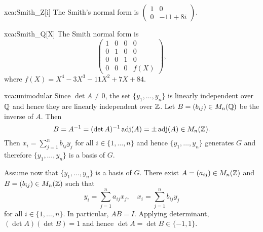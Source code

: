 \begin{sol}{xca:Smith_Z[i]}
	The Smith's normal form is $\begin{pmatrix}
		1 & 0\\
		0 & -11+8i
	\end{pmatrix}$. 
\end{sol}

\begin{sol}{xca:Smith_Q[X]}
	The Smith normal form is 
	\[
		\begin{pmatrix}
			1 & 0 & 0 & 0 \\
			0 & 1 & 0 & 0 \\
			0 & 0 & 1 & 0 \\
			0 & 0 & 0 & f(X)
		\end{pmatrix},
	\]
	where $f(X)=X^4 - 3 X^3 - 11 X^2 + 7X + 84$. 
\end{sol}

\begin{sol}{xca:unimodular}
    Since $\det A\ne 0$, the set $\{y_1,\dots,y_n\}$ is linearly independent over $\mathbb{Q}$
    and hence they are linearly independent over $\mathbb{Z}$. 
    Let $B=(b_{ij})\in M_n(\mathbb{Q})$ be the inverse of $A$. Then 
    \[
    B=A^{-1}=(\det A)^{-1}\operatorname{adj}(A)=\pm\operatorname{adj}(A)\in M_n(\mathbb{Z}).
    \]
    Then $x_i=\sum_{j=1}^n b_{ij}y_j$ for all $i\in\{1,\dots,n\}$ 
    and hence $\{y_1,\dots,y_n\}$ generates $G$ and therefore 
    $\{y_1,\dots,y_n\}$ is a basis of $G$. 
    
    Assume now that $\{y_1,\dots,y_n\}$ is a basis of $G$. There exist
    $A=(a_{ij})\in M_n(\mathbb{Z})$ and $B=(b_{ij})\in M_n(\mathbb{Z})$ such that
    \[
    y_i=\sum_{j=1}^{n}a_{ij}x_j,\quad
    x_i=\sum_{j=1}^{n}b_{ij}y_j
    \]
    for all $i\in\{1,\dots,n\}$. In particular, 
    $AB=I$. Applying determinant, $(\det A)(\det B)=1$ and hence $\det A=\det B\in\{-1,1\}$. 
\end{sol}

    
